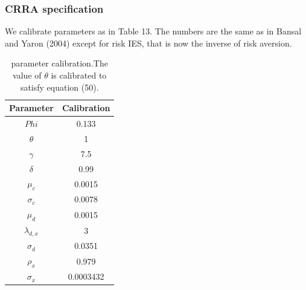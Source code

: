 \documentclass[a4paper,12pt]{scrartcl} %
\begin{document}
\subsubsection{CRRA specification}

We calibrate parameters as in Table 13. The numbers are the same as in Bansal and Yaron (2004) except for risk IES, that is now the inverse of risk aversion.

\begin{table}[htbp!]
\centering\caption{parameter calibration.The value of $\theta$ is calibrated to satisfy equation (50).}\label{13}
\begin{tabular}{cc}
  \hline
  Parameter&Calibration\\
  \hline
  $Phi$&0.133\\
  $\theta$&1\\
  $\gamma$&7.5\\
  $\delta$&0.99\\
  $\mu_c$&0.0015\\
  $\sigma_c$&0.0078\\
  $\mu_d$&0.0015\\
  $\lambda_{d,x}$&3\\
  $\sigma_d$&0.0351\\
  $\rho_x$&0.979\\
  $\sigma_x$&0.0003432\\
  \hline
  \end{tabular}
\end{table}

\vspace{8cm}
\end{document}
